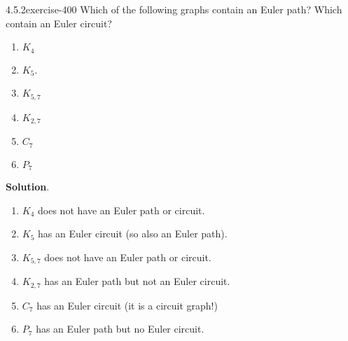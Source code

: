 \documentclass[twoside,11pt,]{book}
\numberwithin{equation}{chapter}
\begin{document}
\begin{divisionsolution}{4.5.2}{}{exercise-400}%
\hypertarget{p-4836}{}%
Which of the following graphs contain an Euler path? Which contain an Euler circuit?\leavevmode%
\begin{multicols}{6}
\begin{enumerate}[label=(\alph*)]
\item\hypertarget{li-2316}{}\(K_4\)%
\item\hypertarget{li-2317}{}\(K_5\).%
\item\hypertarget{li-2318}{}\(K_{5,7}\)%
\item\hypertarget{li-2319}{}\(K_{2,7}\)%
\item\hypertarget{li-2320}{}\(C_7\)%
\item\hypertarget{li-2321}{}\(P_7\)%
\end{enumerate}
\end{multicols}
%
\par\smallskip%
\noindent\textbf{Solution}.\quad%
\hypertarget{p-4837}{}%
\leavevmode%
\begin{enumerate}[label=(\alph*)]
\item\hypertarget{li-2322}{}\(K_4\) does not have an Euler path or circuit.%
\item\hypertarget{li-2323}{}\(K_5\) has an Euler circuit (so also an Euler path).%
\item\hypertarget{li-2324}{}\(K_{5,7}\) does not have an Euler path or circuit.%
\item\hypertarget{li-2325}{}\(K_{2,7}\) has an Euler path but not an Euler circuit.%
\item\hypertarget{li-2326}{}\(C_7\) has an Euler circuit (it is a circuit graph!)%
\item\hypertarget{li-2327}{}\(P_7\) has an Euler path but no Euler circuit.%
\end{enumerate}
%
\end{divisionsolution}%
\end{document}
